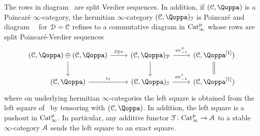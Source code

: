 \begin{proposition}
\label{proposition:I-tensor-poincare}%
The rows in diagram~ are split Verdier sequences. In addition, if $(\C,\QF)$ is a Poincar\'e $\infty$-category, the hermitian $\infty$-category $(\C,\QF)_\I$ is Poincar\'e and diagram~~ for $\mathcal{D}=\mathcal C$ refines to a commutative diagram in $\mathrm{Cat}^{\mathrm p}_\infty$ whose rows are split Poincar\'e-Verdier sequences
\begin{equation}
\label{equation:square-I-Q1}%
\begin{tikzcd}
	(\C,\QF) \oplus (\C,\QF) \ar[r,"l\oplus r"]\ar[d] & (\C,\QF)_{\mathcal{P}} \ar[d] \ar[r,"\ev^{\cP}_{-1}"] & (\C,\QF\qshift{1}) \ar[d,equal]\\
	(\C,\QF) \ar[r,"i_1"] & (\C,\QF)_\I \ar[r,"\ev^{\I}_{-1}"] & (\C,\QF\qshift{1})
\end{tikzcd}
\end{equation}
where on underlying hermitian $\infty$-categories the left square is obtained from the left square of~ by tensoring with $(\C,\QF)$. In addition, the left square is a pushout in $\mathrm{Cat}^{\mathrm p}_\infty$.
In particular, any additive functor $\mathcal{F}\colon \mathrm{Cat}^{\mathrm p}_\infty \to \mathcal{A}$ to a stable $\infty$-category $\mathcal{A}$ sends the left square %
to an exact square. 
\end{proposition}
